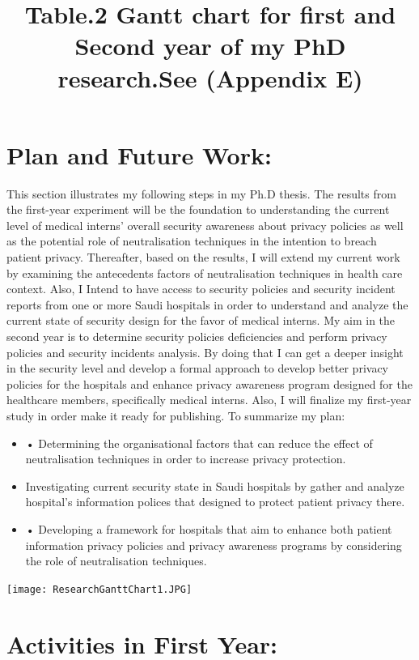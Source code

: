 \section{Plan and Future Work:}
This section illustrates my following steps in my Ph.D thesis. The results from the first-year experiment will be the foundation to understanding the current level of medical interns' overall security awareness about privacy policies as well as the potential role of neutralisation techniques in the intention to breach patient privacy. Thereafter, based on the results, I will extend my current work by examining the antecedents factors of neutralisation techniques in health care context.  Also, I Intend to have access to security policies and security incident reports from one or more Saudi hospitals in order to understand and analyze the current state of security design for the favor of medical interns. My aim in the second year is to determine security policies deficiencies and perform privacy policies and security incidents analysis. By doing that I can get a deeper insight in the security level and develop a formal approach to develop better privacy policies for the hospitals and enhance privacy awareness program designed for the healthcare members, specifically medical interns. Also, I will finalize my first-year study in order make it ready for publishing. To summarize my plan:
\begin{itemize}
	\item •	Determining the organisational factors that can reduce the effect of neutralisation techniques in order to increase privacy protection.
	 \item Investigating current security state in Saudi hospitals by gather and analyze hospital's information polices that designed to protect patient privacy there.
	 \item •	Developing a framework for hospitals that aim to enhance both patient information privacy policies and privacy awareness programs by considering the role of neutralisation techniques.
\end{itemize}

 \graphicspath{ {image/} }
 \begin{center}
 	\texttt{[image: ResearchGanttChart1.JPG]}
\end{center}
\begin{center}
	\title{Table.2 Gantt chart for first and Second year of my PhD research.See (Appendix E)}
\end{center}
\section{Activities in First Year:}

